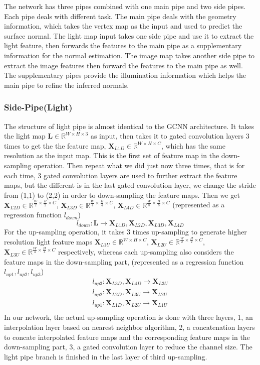 The network has three pipes combined with one main pipe and two side pipes. Each pipe deals with different task. The main pipe deals with the geometry information, which takes the vertex map as the input and used to predict the surface normal. The light map input takes one side pipe and use it to extract the light feature, then forwards the features to the main pipe as a supplementary information for the normal estimation. The image map takes another side pipe to extract the image features then forward the features to the main pipe as well. The supplementary pipes provide the illumination information which helps the main pipe to refine the inferred normals.
\subsubsection{Side-Pipe(Light)}
The structure of light pipe is almost identical to the GCNN architecture. It takes the light map $ \textbf{L} \in \mathbb{R}^{W\times H\times 3}$ as input, then takes it to gated convolution layers 3 times to get the the feature map,
$ \textbf{X}_{L1D} \in \mathbb{R}^{{W}\times H\times C} $,
 which has the same resolution as the input map. This is the first set of feature map in the down-sampling operation.
 Then repeat what we did just now three times, that is for each time, 3 gated convolution layers are used to further extract the feature maps, but the different is in the last gated convolution layer, we change the stride from (1,1) to (2,2) in order to down-sampling the feature maps. Then we get
$ \textbf{X}_{L2D} \in \mathbb{R}^{\frac{W}{2}\times \frac{H}{2}\times C} $,
$ \textbf{X}_{L3D} \in \mathbb{R}^{\frac{W}{4}\times \frac{H}{4}\times C} $,
$ \textbf{X}_{L4D} \in \mathbb{R}^{\frac{W}{8}\times \frac{H}{8}\times C} $
(represented as a regression function $ l_{down} $)
\[ l_{down}: \textbf{L} \rightarrow  \textbf{X}_{L1D} , \textbf{X}_{L2D}, \textbf{X}_{L3D}, \textbf{X}_{L4D} \]
For the up-sampling operation, it takes 3 times up-sampling to generate higher resolution light feature maps
$ \textbf{X}_{L1U} \in \mathbb{R}^{{W}\times {H}\times C} $,
$ \textbf{X}_{L2U} \in \mathbb{R}^{\frac{W}{2}\times \frac{H}{2}\times C} $,
$ \textbf{X}_{L3U} \in \mathbb{R}^{\frac{W}{4}\times \frac{H}{4}\times C} $ respectively, whereas each up-sampling also considers the feature maps in the down-sampling part,
(represented as a regression function $ l_{up1}, l_{up2}, l_{up3} $)
\[ 
\begin{matrix}
	l_{up3} : \textbf{X}_{L3D}, \textbf{X}_{L4D} \rightarrow \textbf{X}_{L3U} \\
	l_{up2} : \textbf{X}_{L2D}, \textbf{X}_{L3U} \rightarrow \textbf{X}_{L2U} \\
	l_{up1} : \textbf{X}_{L1D}, \textbf{X}_{L2U} \rightarrow \textbf{X}_{L1U} \\
\end{matrix}
\]
In our network, the actual up-sampling operation is done with three layers, 1, an interpolation layer based on nearest neighbor algorithm, 2, a concatenation layers to concate interpolated feature maps and the corresponding feature maps in the down-sampling part, 3, a gated convolution layer to reduce the channel size.
The light pipe branch is finished in the last layer of third up-sampling.

